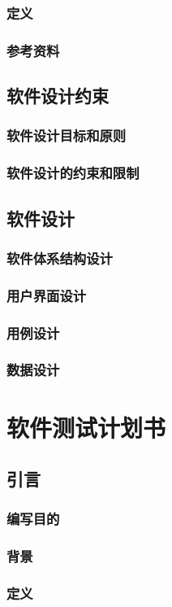 \documentclass[
    report,     %
    oneside,    %
    UTF8,       %
    zihao=-4    %
]{config} %
\begin{document}
\subsection{定义}
\subsection{参考资料}
\section{软件设计约束}
\subsection{软件设计目标和原则}
\subsection{软件设计的约束和限制}
\section{软件设计}
\subsection{软件体系结构设计}
\subsection{用户界面设计}
\subsection{用例设计}
\subsection{数据设计}
\chapter{软件测试计划书}
\section{引言}
\subsection{编写目的}
\subsection{背景}
\subsection{定义}
\end{document}
